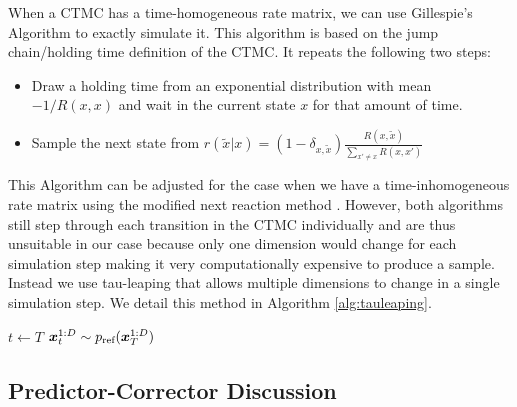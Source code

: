 \documentclass{article}
\begin{document}
When a CTMC has a time-homogeneous rate matrix, we can use Gillespie's Algorithm \cite{gillespie1976general, gillespie1977exact,wilkinson2018stochastic} to exactly simulate it. This algorithm is based on the jump chain/holding time definition of the CTMC. It repeats the following two steps:
\begin{itemize}
    \item Draw a holding time from an exponential distribution with mean $-1 / R(x, x)$ and wait in the current state $x$ for that amount of time.
    \item Sample the next state from $r(\tilde{x} | x) = (1 - \delta_{x, \tilde{x}}) \frac{R(x, \tilde{x})}{\sum_{x' \neq x} R(x, x')}$
\end{itemize}
This Algorithm can be adjusted for the case when we have a time-inhomogeneous rate matrix using the modified next reaction method \cite{anderson2007modified}. However, both algorithms still step through each transition in the CTMC individually and are thus unsuitable in our case because only one dimension would change for each simulation step making it very computationally expensive to produce a sample. Instead we use tau-leaping that allows multiple dimensions to change in a single simulation step. We detail this method in Algorithm \ref{alg:tauleaping}.


\begin{algorithm}[t]
\SetAlgoNoLine
\DontPrintSemicolon
$t \leftarrow T$\;
$\bm{x}_t^{1:D} \sim p_{\textrm{ref}}(\bm{x}_T^{1:D})$\;
 \caption{Generative Reverse Process Simulation with Tau-Leaping}
 \label{alg:tauleaping}
\end{algorithm}

\subsection{Predictor-Corrector Discussion} \label{sec:ApdxPredictorCorrectorDiscussion}
\end{document}
